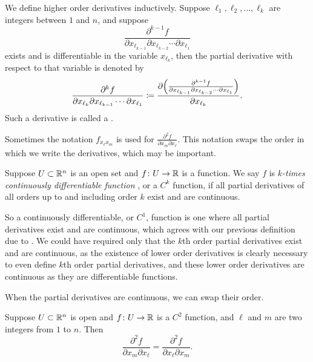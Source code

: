 We define higher order derivatives inductively.
Suppose ${\ell}_1,{\ell}_2,\ldots,{\ell}_k$ are integers between $1$ and $n$, and
suppose 
\begin{equation*}
\frac{\partial^{k-1} f}{\partial x_{{\ell}_{k-1}} \partial x_{{\ell}_{k-2}}
\cdots \partial x_{{\ell}_1}}
\end{equation*}
exists and is differentiable in the variable $x_{{\ell}_{k}}$, then the
partial derivative with respect to that variable is denoted by
\begin{equation*}
\frac{\partial^{k} f}{\partial x_{{\ell}_{k}} \partial x_{{\ell}_{k-1}}
\cdots \partial x_{{\ell}_1}}
\coloneqq 
\frac{\partial \Bigl( \frac{\partial^{k-1} f}{\partial x_{{\ell}_{k-1}} \partial
x_{{\ell}_{k-2}} \cdots \partial x_{{\ell}_1}} \Bigr)}{\partial x_{{\ell}_{k}}} .
\end{equation*}
Such a derivative is called a
\emph{}.

Sometimes the notation $f_{x_{\ell} x_m}$ is used for
$\frac{\partial^2 f}{\partial x_m \partial x_{\ell}}$.  This notation
swaps the order in which we write the derivatives, which may be important.

\begin{defn}
Suppose $U \subset {\mathbb{R}}^n$ is an open set and
$f \colon U \to {\mathbb{R}}$ is a function.  We say $f$ is
\emph{$k$-times continuously differentiable function}%
,
or a $C^k$ function, if all partial derivatives of all orders up to and
including order $k$ exist and are continuous.
\end{defn}

So a continuously differentiable, or $C^1$, function is one where all partial
derivatives exist and are continuous, which agrees with our previous
definition due to .  We
could have required only that the $k$th order partial derivatives exist and
are continuous, as the existence of lower order derivatives is clearly
necessary to even define $k$th order partial derivatives,
and these lower order derivatives are continuous as they are differentiable
functions.

When the partial derivatives are continuous, we can swap their order.

\begin{prop} \label{mv:prop:swapders}
Suppose $U \subset {\mathbb{R}}^n$ is open and $f \colon U \to {\mathbb{R}}$ is a $C^2$
function, and $\ell$ and $m$ are two integers from $1$ to $n$.  Then
\begin{equation*}
\frac{\partial^2 f}{\partial x_m \partial x_{\ell}}
=
\frac{\partial^2 f}{\partial x_{\ell} \partial x_m} .
\end{equation*}
\end{prop}

